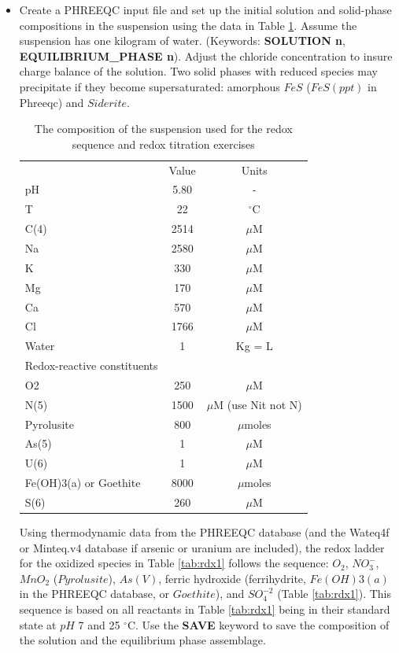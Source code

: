 \begin{itemize}
\item Create a PHREEQC input file and set up the initial solution and solid-phase compositions 
in the suspension using the data in Table \ref{tab:rdx3}.  
Assume the suspension has one kilogram of water.  
(Keywords: {\color{red} \textbf{SOLUTION n}}, {\color{red} \textbf{EQUILIBRIUM\_PHASE n}}).  
Adjust the chloride concentration to insure charge balance of the solution. 
Two solid phases with reduced species may precipitate if they become supersaturated: 
amorphous $FeS$ ($FeS(ppt)$ in Phreeqc) and $Siderite$.

\begin{table}[h]
\caption{The composition of the suspension used for the redox sequence and redox titration exercises}
\begin{center}
\begin{tabular}{lcc} 
\hline
	   & Value	 & Units \\
pH	 & 5.80	   & - \\
T 	 & 22	     & $^\circ$C \\
C(4) &	2514	 & $\mu$M \\
Na	 & 2580	   & $\mu$M \\
K	   & 330	   & $\mu$M \\
Mg	 & 170	   & $\mu$M \\
Ca	 & 570	   & $\mu$M \\
Cl	 & 1766	   & $\mu$M \\ 
Water	& 1	     & Kg = L \\ \hline %
Redox-reactive constituents & &\\ \hline
O2 	  & 250	      & $\mu$M \\
N(5)	& 1500	    & $\mu$M (use Nit not N) \\
Pyrolusite & 800	& $\mu$moles \\
As(5)      &	1	  & $\mu$M \\
U(6)	     &  1	  & $\mu$M \\
Fe(OH)3(a) or Goethite 	& 8000	& $\mu$moles \\
S(6) 	                  & 260	  & $\mu$M \\ \hline
\end{tabular}
\label{tab:rdx3}
\end{center}
\end{table}


Using thermodynamic data from the PHREEQC database 
(and the Wateq4f or Minteq.v4 database if arsenic or uranium are included), 
the redox ladder for the oxidized species in Table \ref{tab:rdx1} follows the sequence: 
$O_2$, $NO_3^-$, $MnO_2$ ($Pyrolusite$), $As(V)$, ferric hydroxide (ferrihydrite, $Fe(OH)3(a)$ 
in the PHREEQC database, or $Goethite$), and $SO_4^{-2}$ 
(Table \ref{tab:rdx1}).  
This sequence is based on all reactants in Table \ref{tab:rdx1} 
being in their standard state at $pH$ 7 and 25 $^\circ$C.  
Use the {\color{red} \textbf{SAVE}} keyword to save 
the composition of the solution and the equilibrium phase assemblage.


\end{itemize}
